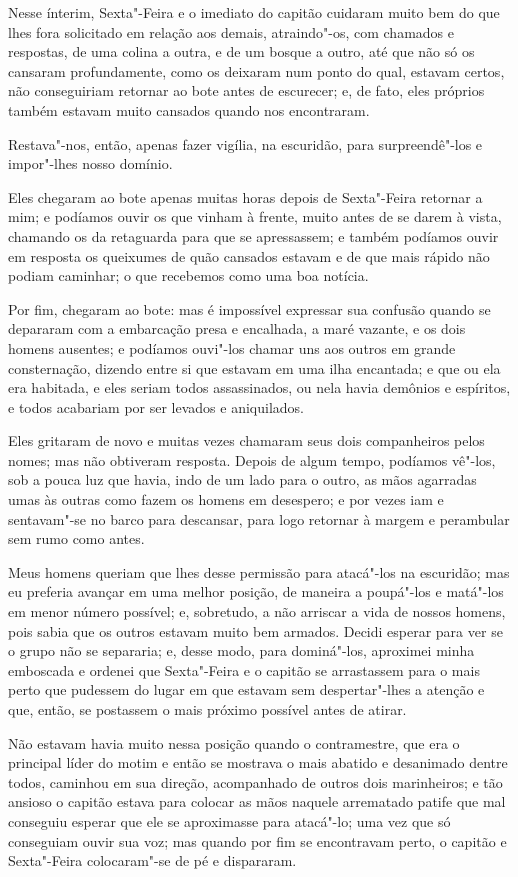 Nesse ínterim, Sexta"-Feira e o imediato do capitão cuidaram muito bem do
que lhes fora solicitado em relação aos demais, atraindo"-os, com
chamados e respostas, de uma colina a outra, e de um bosque a outro, até
que não só os cansaram profundamente, como os deixaram num ponto do
qual, estavam certos, não conseguiriam retornar ao bote antes de
escurecer; e, de fato, eles próprios também estavam muito cansados
quando nos encontraram.

Restava"-nos, então, apenas fazer vigília, na escuridão, para
surpreendê"-los e impor"-lhes nosso domínio.

Eles chegaram ao bote apenas muitas horas depois de Sexta"-Feira retornar
a mim; e podíamos ouvir os que vinham à frente, muito antes de se darem
à vista, chamando os da retaguarda para que se apressassem; e também
podíamos ouvir em resposta os queixumes de quão cansados estavam e de
que mais rápido não podiam caminhar; o que recebemos como uma boa
notícia.

Por fim, chegaram ao bote: mas é impossível expressar sua confusão
quando se depararam com a embarcação presa e encalhada, a maré vazante,
e os dois homens ausentes; e podíamos ouvi"-los chamar uns aos outros em
grande consternação, dizendo entre si que estavam em uma ilha encantada;
e que ou ela era habitada, e eles seriam todos assassinados, ou nela
havia demônios e espíritos, e todos acabariam por ser levados e
aniquilados.

Eles gritaram de novo e muitas vezes chamaram seus dois companheiros
pelos nomes; mas não obtiveram resposta. Depois de algum tempo, podíamos
vê"-los, sob a pouca luz que havia, indo de um lado para o outro, as mãos
agarradas umas às outras como fazem os homens em desespero; e por vezes
iam e sentavam"-se no barco para descansar, para logo retornar à margem e
perambular sem rumo como antes.

Meus homens queriam que lhes desse permissão para atacá"-los na
escuridão; mas eu preferia avançar em uma melhor posição, de maneira a
poupá"-los e matá"-los em menor número possível; e, sobretudo, a não
arriscar a vida de nossos homens, pois sabia que os outros estavam muito
bem armados. Decidi esperar para ver se o grupo não se separaria; e,
desse modo, para dominá"-los, aproximei minha emboscada e ordenei que
Sexta"-Feira e o capitão se arrastassem para o mais perto que pudessem do
lugar em que estavam sem despertar"-lhes a atenção e que, então, se
postassem o mais próximo possível antes de atirar.

Não estavam havia muito nessa posição quando o contramestre, que era o
principal líder do motim e então se mostrava o mais abatido e desanimado
dentre todos, caminhou em sua direção, acompanhado de outros dois
marinheiros; e tão ansioso o capitão estava para colocar as mãos naquele
arrematado patife que mal conseguiu esperar que ele se aproximasse para
atacá"-lo; uma vez que só conseguiam ouvir sua voz; mas quando por fim se
encontravam perto, o capitão e Sexta"-Feira colocaram"-se de pé e
dispararam.

